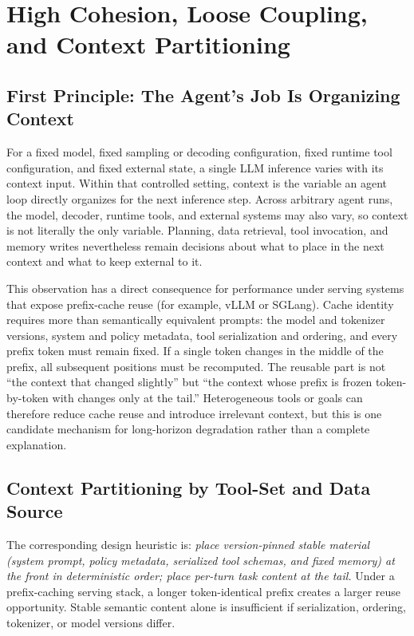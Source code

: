 \section{High Cohesion, Loose Coupling, and Context Partitioning}
\label{sec:cohesion}

\subsection{First Principle: The Agent's Job Is Organizing Context}
\label{sec:first-principle}

For a fixed model, fixed sampling or decoding configuration, fixed runtime tool configuration, and fixed external state, a single LLM inference varies with its context input. Within that controlled setting, context is the variable an agent loop directly organizes for the next inference step. Across arbitrary agent runs, the model, decoder, runtime tools, and external systems may also vary, so context is not literally the only variable. Planning, data retrieval, tool invocation, and memory writes nevertheless remain decisions about what to place in the next context and what to keep external to it.

This observation has a direct consequence for performance under serving systems that expose prefix-cache reuse (for example, vLLM or SGLang). Cache identity requires more than semantically equivalent prompts: the model and tokenizer versions, system and policy metadata, tool serialization and ordering, and every prefix token must remain fixed. If a single token changes in the middle of the prefix, all subsequent positions must be recomputed. The reusable part is not ``the context that changed slightly'' but ``the context whose prefix is frozen token-by-token with changes only at the tail.'' Heterogeneous tools or goals can therefore reduce cache reuse and introduce irrelevant context, but this is one candidate mechanism for long-horizon degradation rather than a complete explanation.

\subsection{Context Partitioning by Tool-Set and Data Source}

The corresponding design heuristic is: \textit{place version-pinned stable material (system prompt, policy metadata, serialized tool schemas, and fixed memory) at the front in deterministic order; place per-turn task content at the tail.} Under a prefix-caching serving stack, a longer token-identical prefix creates a larger reuse opportunity. Stable semantic content alone is insufficient if serialization, ordering, tokenizer, or model versions differ.

